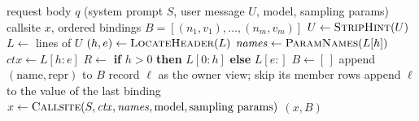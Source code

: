 
\begin{algorithm}[t]
\caption{Decompiling a request into a callsite and its bindings}
\label{alg:decompile}
\begin{algorithmic}[1]
\Require request body $q$ (system prompt $S$, user message $U$, model, sampling params)
\Ensure callsite $x$, ordered bindings $B = [(n_1, v_1), \dots, (n_m, v_m)]$
\State $U \gets \textsc{StripHint}(U)$ 
\State $L \gets$ lines of $U$
\State $(h, e) \gets \textsc{LocateHeader}(L)$ 
\State $\mathit{names} \gets \textsc{ParamNames}(L[h])$ 
\State $\mathit{ctx} \gets L[h:e]$ 
\State $R \gets$ \textbf{if} $h > 0$ \textbf{then} $L[0:h]$ \textbf{else} $L[e:]$ 
\State $B \gets [\,]$
        \State append $(\text{name}, \text{repr})$ to $B$ 
        \State record $\ell$ as the owner view; skip its member rows
        \State append $\ell$ to the value of the last binding 
    \EndIf
\EndFor
\State $x \gets \textsc{Callsite}(S, \mathit{ctx}, \mathit{names}, \text{model}, \text{sampling params})$ 
\State \Return $(x, B)$
\end{algorithmic}
\end{algorithm}

